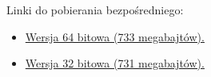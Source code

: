 Linki do pobierania bezpośredniego:
\begin{itemize}
\item \href{http://www.ubuntu.com/start-download?distro=desktop&bits=64&release=lts}{Wersja 64 bitowa (733 megabajtów).}
\item \href{http://www.ubuntu.com/start-download?distro=desktop&bits=32&release=lts}{Wersja 32 bitowa (731 megabajtów).}
\end{itemize}
\clearpage
